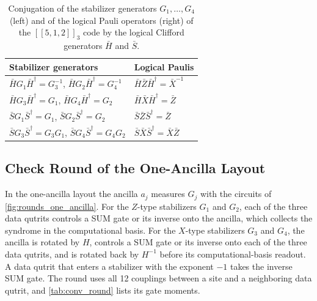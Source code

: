 \begin{table}[tp]
  \centering
  \begin{tabular}{l|l}
    \hline
    Stabilizer generators & Logical Paulis \\
    \hline
    $\bar H G_1 \bar H^\dagger = G_3^{-1}$, \quad $\bar H G_2 \bar H^\dagger = G_4^{-1}$
      & $\bar H \bar Z \bar H^\dagger = \bar X^{-1}$ \\
    $\bar H G_3 \bar H^\dagger = G_1$, \quad $\bar H G_4 \bar H^\dagger = G_2$
      & $\bar H \bar X \bar H^\dagger = \bar Z$ \\
    $\bar S G_1 \bar S^\dagger = G_1$, \quad $\bar S G_2 \bar S^\dagger = G_2$
      & $\bar S \bar Z \bar S^\dagger = \bar Z$ \\
    $\bar S G_3 \bar S^\dagger = G_3 G_1$, \quad $\bar S G_4 \bar S^\dagger = G_4 G_2$
      & $\bar S \bar X \bar S^\dagger = \bar X \bar Z$ \\
    \hline
  \end{tabular}
  \caption{Conjugation of the stabilizer generators $G_1, \dots, G_4$ (left) and of the logical Pauli operators (right) of the $[[5,1,2]]_3$ code by the logical Clifford generators $\bar H$ and $\bar S$.}
  \label{tab:clifford-conjugation}
\end{table}

\subsection{Check Round of the One-Ancilla Layout}
\label{app:rounds-one-ancilla}

In the one-ancilla layout the ancilla $a_j$ measures $G_j$ with the circuits of \autoref{fig:rounds_one_ancilla}. For the $Z$-type stabilizers $G_1$ and $G_2$, each of the three data qutrits controls a SUM gate or its inverse onto the ancilla, which collects the syndrome in the computational basis. For the $X$-type stabilizers $G_3$ and $G_4$, the ancilla is rotated by $H$, controls a SUM gate or its inverse onto each of the three data qutrits, and is rotated back by $H^{-1}$ before its computational-basis readout. A data qutrit that enters a stabilizer with the exponent $-1$ takes the inverse SUM gate. The round uses all 12 couplings between a site and a neighboring data qutrit, and \autoref{tab:conv_round} lists its gate moments.

